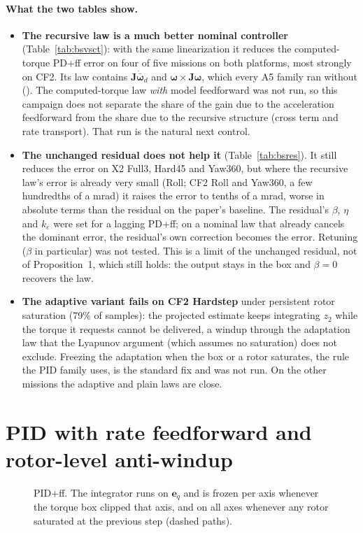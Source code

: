 \documentclass[11pt]{article}
\newcommand{\code}[1]{\path{#1}}
\theoremstyle{remark}
\newcommand{\archfig}[3]{%
  \begin{figure}[H]\centering\resizebox{\textwidth}{!}{}\caption{#2}\label{#3}\end{figure}}
\begin{document}
\paragraph{What the two tables show.}
\begin{itemize}[leftmargin=1.2em]
\item \textbf{The recursive law is a much better nominal controller} (Table~\ref{tab:bsvsct}): with the same linearization it
  reduces the computed-torque PD+ff error on four of five missions on both platforms, most strongly on CF2. Its law contains
  $\bm J\dot{\bar{\bm\omega}}_d$ and $\bm\omega\times\bm J\bm\omega$, which every A5 family ran without (\code{--no-model-ff}). The
  computed-torque law \emph{with} model feedforward was not run, so this campaign does not separate the share of the gain due to the
  acceleration feedforward from the share due to the recursive structure (cross term and rate transport). That run is the
  natural next control.
\item \textbf{The unchanged residual does not help it} (Table~\ref{tab:bsres}). It still reduces the error on X2 Full3, Hard45
  and Yaw360, but where the recursive law's error is already very small (Roll; CF2 Roll and Yaw360, a few hundredths of a mrad) it
  raises the error to tenths of a mrad, worse in absolute terms than the residual on the paper's baseline. The residual's
  $\beta$, $\eta$ and $k_e$ were set for a lagging PD+ff; on a nominal law that already cancels the dominant error, the residual's
  own correction becomes the error. Retuning ($\beta$ in particular) was not tested. This is a limit of the unchanged residual,
  not of Proposition~1, which still holds: the output stays in the box and $\beta=0$ recovers the law.
\item \textbf{The adaptive variant fails on CF2 Hardstep} under persistent rotor saturation (79\% of samples): the projected estimate
  keeps integrating $z_2$ while the torque it requests cannot be delivered, a windup through the adaptation law that the
  Lyapunov argument (which assumes no saturation) does not exclude. Freezing the adaptation when the box or a rotor saturates, the
  rule the PID family uses, is the standard fix and was not run. On the other missions the adaptive and plain laws are close.
\end{itemize}
\fi %

\section{PID with rate feedforward and rotor-level anti-windup}\label{sec:pid}
\archfig{fig_pid.tex}{PID+ff. The integrator runs on $\bm e_q$ and is frozen per axis whenever the torque box clipped that axis,
and on all axes whenever any rotor saturated at the previous step (dashed paths).}{fig:pid}
\end{document}
